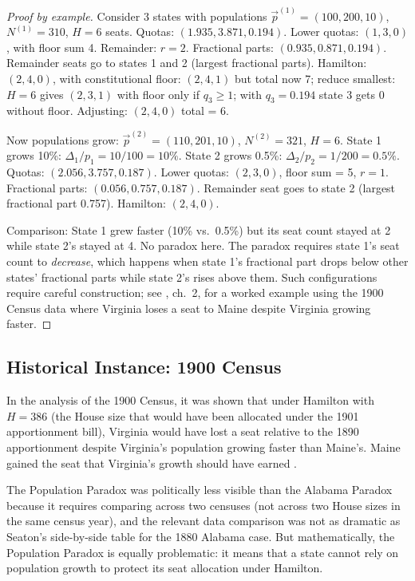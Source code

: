 \begin{proof}[Proof by example]
  Consider 3 states with populations $\vec{p}^{(1)} = (100, 200, 10)$,
  $N^{(1)} = 310$, $H = 6$ seats.
  Quotas: $(1.935, 3.871, 0.194)$.
  Lower quotas: $(1, 3, 0)$, with floor sum 4.
  Remainder: $r = 2$.
  Fractional parts: $(0.935, 0.871, 0.194)$.
  Remainder seats go to states 1 and 2 (largest fractional parts).
  Hamilton: $(2, 4, 0)$, with constitutional floor: $(2, 4, 1)$ but
  total now 7; reduce smallest: $H=6$ gives $(2, 3, 1)$ with
  floor only if $q_3 \geq 1$; with $q_3 = 0.194$ state 3 gets 0
  without floor.
  Adjusting: $(2, 4, 0)$ total = 6.

  Now populations grow: $\vec{p}^{(2)} = (110, 201, 10)$,
  $N^{(2)} = 321$, $H = 6$.
  State 1 grows 10\%: $\Delta_1/p_1 = 10/100 = 10\%$.
  State 2 grows 0.5\%: $\Delta_2/p_2 = 1/200 = 0.5\%$.
  Quotas: $(2.056, 3.757, 0.187)$.
  Lower quotas: $(2, 3, 0)$, floor sum = 5, $r = 1$.
  Fractional parts: $(0.056, 0.757, 0.187)$.
  Remainder seat goes to state 2 (largest fractional part 0.757).
  Hamilton: $(2, 4, 0)$.

  Comparison: State 1 grew faster (10\% vs.\ 0.5\%)
  but its seat count stayed at 2 while state 2's stayed at 4.
  No paradox here.
  The paradox requires state 1's seat count to \emph{decrease},
  which happens when state 1's fractional part drops below other
  states' fractional parts while state 2's rises above them.
  Such configurations require careful construction; see
  \citet{balinski1982fair}, ch.~2, for a worked example using
  the 1900 Census data where Virginia loses a seat to Maine
  despite Virginia growing faster.
\end{proof}

\subsection{Historical Instance: 1900 Census}

In the analysis of the 1900 Census, it was shown that under Hamilton
with $H = 386$ (the House size that would have been allocated
under the 1901 apportionment bill), Virginia would have lost a seat
relative to the 1890 apportionment despite Virginia's population
growing faster than Maine's.
Maine gained the seat that Virginia's growth should have earned
\citep{balinski1982fair}.

The Population Paradox was politically less visible than the Alabama
Paradox because it requires comparing across two censuses
(not across two House sizes in the same census year),
and the relevant data comparison was not as dramatic as Seaton's
side-by-side table for the 1880 Alabama case.
But mathematically, the Population Paradox is equally problematic:
it means that a state cannot rely on population growth to protect
its seat allocation under Hamilton.
